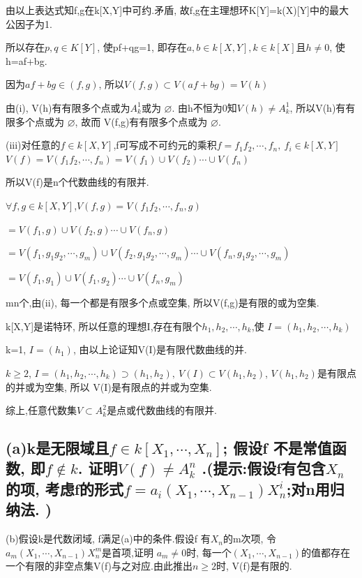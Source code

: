 \documentclass[UTF8]{book}
\begin{document}
	由以上表达式知f,g在k[X,Y]中可约.矛盾, 故f,g在主理想环K[Y]=k(X)[Y]中的最大公因子为1.
	
	所以存在$p,q\in K[Y]$, 使pf+qg=1, 即存在$a,b \in k[X,Y] , k\in k[X]$且$h\neq 0 $, 使h=af+bg.
	
	因为$af+bg\in (f,g)$, 所以$V(f,g)\subset V(af+bg)=V(h)$
	
	由(i), V(h)有有限多个点或为$A^{1}_{k}$或为 $\varnothing$. 由h不恒为0知$V(h)\neq A^{1}_{k}$, 所以V(h)有有限多个点或为 $\varnothing$, 故而
	V(f,g)有有限多个点或为 $\varnothing$.
	
	(iii)对任意的$f\in k[X,Y]$,f可写成不可约元的乘积$f=f_{1}f_{2}, \cdots , f_{n},\ f_{i}\in k[X,Y]$
	$V(f)=V(f_{1}f_{2}, \cdots , f_{n})=V(f_{1})\cup V(f_{2}) \cdots \cup V(f_{n})$
	
	所以V(f)是n个代数曲线的有限并.
	
	$\forall f,g \in k[X,Y]$,$ V(f,g)=V(f_{1}f_{2}, \cdots , f_{n},g)$
	
	$=V(f_{1},g)\cup V(f_{2},g) \cdots \cup V(f_{n},g)$
	
	$=V(f_{1},g_{1}g_{2}, \cdots , g_{m})\cup V(f_{2},g_{1}g_{2}, \cdots , g_{m}) \cdots \cup V(f_{n},g_{1}g_{2}, \cdots , g_{m})$
	
	$=V(f_{1},g_{1}) \cup V(f_{1},g_{2}) \cdots  \cup V(f_{n},g_{m})$
	
	mn个,由(ii), 每一个都是有限多个点或空集, 所以V(f,g)是有限的或为空集.
	
	k[X,Y]是诺特环, 所以任意的理想I,存在有限个$h_{1},h_{2}, \cdots , h_{k}$,使 $I=(h_{1},h_{2}, \cdots , h_{k})$
	
	k=1, $I=(h_{1})$, 由以上论证知V(I)是有限代数曲线的并.
	
	$k\geq 2$, $I=(h_{1},h_{2}, \cdots , h_{k})\supset (h_{1},h_{2}), \ V(I)\subset V(h_{1},h_{2}) $, $V(h_{1},h_{2})$是有限点的并或为空集, 所以 V(I)是有限点的并或为空集.
	
	综上,任意代数集$V \subset A^{2}_{k}$是点或代数曲线的有限并.
	
	\subsection{(a)k是无限域且$f\in k[X_{1}, \cdots , X_{n}]$; 假设f 不是常值函数, 即$f\notin k$. 证明$V(f)\neq A^{n}_{k}$ .(提示:假设f有包含$X_{n}$的项, 考虑f的形式$f=a_{i}(X_{1}, \cdots , X_{n-1})X^{i}_{n} $;对n用归纳法. )}
	
	(b)假设k是代数闭域, f满足(a)中的条件.假设f 有$X_{n}$的m次项, 令$a_{m}(X_{1}, \cdots , X_{n-1})X^{m}_{n} $是首项,证明 $a_{m}\neq 0$时, 每一个$(X_{1}, \cdots , X_{n-1}) $的值都存在一个有限的非空点集V(f)与之对应.由此推出$n\geq 2$时, V(f)是有限的.
	
\end{document}
